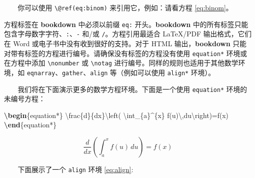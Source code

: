 \documentclass[
  12pt,
]{krantz}
\makeatletter
\newenvironment{Shaded}{\begin{snugshade}}{\end{snugshade}}
\newcommand{\ExtensionTok}[1]{#1}
\newcommand{\KeywordTok}[1]{\textcolor[rgb]{0.13,0.29,0.53}{\textbf{#1}}}
\newcommand{\NormalTok}[1]{#1}
\newcommand{\SpecialCharTok}[1]{\textcolor[rgb]{0.00,0.00,0.00}{#1}}
\newcommand{\SpecialStringTok}[1]{\textcolor[rgb]{0.31,0.60,0.02}{#1}}
\newenvironment{kframe}{%
\medskip{}
\setlength{\fboxsep}{.8em}
 \def\at@end@of@kframe{}%
 \ifinner\ifhmode%
  \def\at@end@of@kframe{\end{minipage}}%
  \begin{minipage}{\columnwidth}%
 \fi\fi%
 \def\FrameCommand##1{\hskip\@totalleftmargin \hskip-\fboxsep
 \colorbox{shadecolor}{##1}\hskip-\fboxsep
     \hskip-\linewidth \hskip-\@totalleftmargin \hskip\columnwidth}%
 \MakeFramed {\advance\hsize-\width
   \@totalleftmargin\z@ \linewidth\hsize
   \@setminipage}}%
 {\par\unskip\endMakeFramed%
 \at@end@of@kframe}
\newenvironment{rmdblock}[1]
  {
  \begin{itemize}
  \renewcommand{\labelitemi}{
    \raisebox{-.7\height}[0pt][0pt]{
      {\setkeys{Gin}{width=3em,keepaspectratio}\texttt{[image: images/\#1]}}
    }
  }
  \setlength{\fboxsep}{1em}
  \begin{kframe}
  \item
  }
  {
  \end{kframe}
  \end{itemize}
  }
\newenvironment{rmdcaution}
  {\begin{rmdblock}{caution}}
  {\end{rmdblock}}
\theoremstyle{definition}
\theoremstyle{definition}
\theoremstyle{definition}
\theoremstyle{definition}
\theoremstyle{remark}
\makeatother
\begin{document}
  你可以使用 \texttt{\textbackslash{}@ref(eq:binom)} 来引用它，例如：请看方程 \eqref{eq:binom}。

\begin{rmdcaution}
方程标签在 \textbf{bookdown} 中必须以前缀 \texttt{eq:} 开头。\textbf{bookdown} 中的所有标签只能包含字母数字字符、\texttt{:}、\texttt{-} 和/或 \texttt{/}。方程引用最适合 LaTeX/PDF 输出格式，它们在 Word 或电子书中没有收到很好的支持。对于 HTML 输出，\textbf{bookdown} 只能对带有标签的方程进行编号。请确保没有标签的方程没有使用 \texttt{equation*} 环境或在方程中添加 \texttt{\textbackslash{}nonumber} 或 \texttt{\textbackslash{}notag} 进行编号。同样的规则也适用于其他数学环境，如 \texttt{eqnarray}、\texttt{gather}、\texttt{align} 等（例如可以使用 \texttt{align*} 环境）。
\end{rmdcaution}

  我们将在下面演示更多的数学方程环境。下面是一个使用 \texttt{equation*} 环境的未编号方程：

\begin{Shaded}
\begin{Highlighting}[]
\KeywordTok{\textbackslash{}begin}\NormalTok{\{}\ExtensionTok{equation*}\NormalTok{\}}\SpecialStringTok{ }
\SpecialCharTok{\textbackslash{}frac}\SpecialStringTok{\{d\}\{dx\}}\SpecialCharTok{\textbackslash{}left}\SpecialStringTok{( }\SpecialCharTok{\textbackslash{}int}\SpecialStringTok{\_\{a\}\^{}\{x\} f(u)}\SpecialCharTok{\textbackslash{},}\SpecialStringTok{du}\SpecialCharTok{\textbackslash{}right}\SpecialStringTok{)=f(x)}
\KeywordTok{\textbackslash{}end}\NormalTok{\{}\ExtensionTok{equation*}\NormalTok{\} }
\end{Highlighting}
\end{Shaded}

\begin{equation*}
\frac{d}{dx}\left( \int_{a}^{x} f(u)\,du\right)=f(x)
\end{equation*}

  下面展示了一个 \texttt{align} 环境 \eqref{eq:align}:
\end{document}
